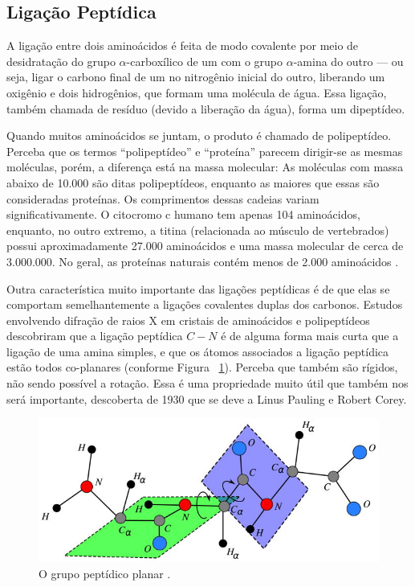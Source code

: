 \subsection*{Ligação Peptídica}
A ligação entre dois aminoácidos é feita de modo covalente por meio de desidratação do grupo $\alpha$-carboxílico de um com o grupo $\alpha$-amina do outro --- ou seja, ligar o carbono final de um no nitrogênio inicial do outro, liberando um oxigênio e dois hidrogênios, que formam uma molécula de água. Essa ligação, também chamada de resíduo (devido a liberação da água), forma um dipeptídeo. 

Quando muitos aminoácidos se juntam, o produto é chamado de polipeptídeo. Perceba que os termos ``polipeptídeo'' e ``proteína'' parecem dirigir-se as mesmas moléculas, porém, a diferença está na massa molecular: As moléculas com massa abaixo de 10.000 são ditas polipeptídeos, enquanto as maiores que essas são consideradas proteínas. Os comprimentos dessas cadeias variam significativamente. O citocromo c humano tem apenas 104 aminoácidos, enquanto, no outro extremo, a titina (relacionada ao músculo de vertebrados) possui aproximadamente 27.000 aminoácidos e uma massa molecular de cerca de 3.000.000. No geral, as proteínas naturais contém menos de 2.000 aminoácidos \cite{bioquimicaLehninger}.

Outra característica muito importante das ligações peptídicas é de que elas se comportam semelhantemente a ligações covalentes duplas dos carbonos. Estudos envolvendo difração de raios X em cristais de aminoácidos e polipeptídeos descobriram que a ligação peptídica $C-N$ é de alguma forma mais curta que a ligação de uma amina simples, e que os átomos associados a ligação peptídica estão todos co-planares (conforme Figura ~\ref{fig:peptidica}). Perceba que também são rígidos, não sendo possível a rotação. Essa é uma propriedade muito útil que também nos será importante, descoberta de 1930 que se deve a Linus Pauling e Robert Corey.

\begin{figure}[H]
	\begin{center}
		\includegraphics[width=0.8\linewidth]{secProteins/figures/peptide.jpg}
	\end{center}
	\caption{O grupo peptídico planar \cite{carlile:MinimalOrder}.}
	\label{fig:peptidica}
\end{figure}


